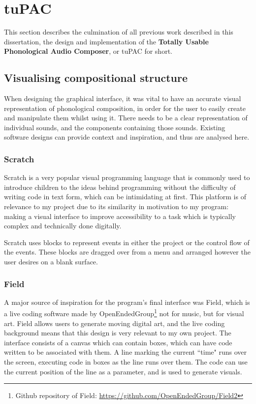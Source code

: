 \documentclass[12pt,a4paper,oneside,openright]{report}
\begin{document}
\section{tuPAC}

This section describes the culmination of all previous work described in this dissertation, the design and implementation of the \textbf{Totally Usable Phonological Audio Composer}, or tuPAC for short.

\subsection{Visualising compositional structure}
When designing the graphical interface, it was vital to have an accurate visual representation of phonological composition, in order for the user to easily create and manipulate them whilst using it. There needs to be a clear representation of individual sounds, and the components containing those sounds. Existing software designs can provide context and inspiration, and thus are analysed here.

\subsubsection{Scratch}
Scratch is a very popular visual programming language that is commonly used to introduce children to the ideas behind programming without the difficulty of writing code in text form, which can be intimidating at first. This platform is of relevance to my project due to its similarity in motivation to my program: making a visual interface to improve accessibility to a task which is typically complex and technically done digitally. 

Scratch uses blocks to represent events in either the project or the control flow of the events. These blocks are dragged over from a menu and arranged however the user desires on a blank surface.

\subsubsection{Field}
A major source of inspiration for the program's final interface was Field, which is a live coding software made by OpenEndedGroup\footnote{Github repository of Field: \url{https://github.com/OpenEndedGroup/Field2}} not for music, but for visual art. Field allows users to generate moving digital art, and the live coding background means that this design is very relevant to my own project. The interface consists of a canvas which can contain boxes, which can have code written to be associated with them. A line marking the current ``time" runs over the screen, executing code in boxes as the line runs over them. The code can use the current position of the line as a parameter, and is used to generate visuals. 
\end{document}
